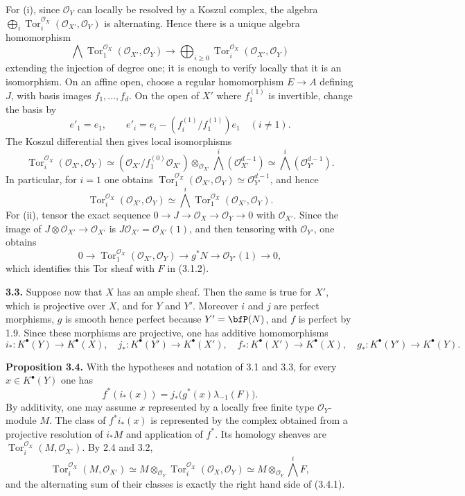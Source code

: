 \documentclass[11pt]{article}
\newcommand{\Tor}{\operatorname{Tor}}
\providecommand{\Tor}{\operatorname{Tor}}
\providecommand{\cO}{\mathcal O}
\begin{document}
For (i), since \(\cO_Y\) can locally be resolved by a Koszul complex, the algebra \(\bigoplus_i\Tor_i^{\cO_X}(\cO_{X'},\cO_Y)\) is alternating. Hence there is a unique algebra homomorphism
\begin{equation}\tag{3.2.1}
\bigwedge \Tor_1^{\cO_X}(\cO_{X'},\cO_Y)
\longrightarrow
\bigoplus_{i\ge0}\Tor_i^{\cO_X}(\cO_{X'},\cO_Y)
\end{equation}
extending the injection of degree one; it is enough to verify locally that it is an isomorphism. On an affine open, choose a regular homomorphism \(E\to A\) defining \(J\), with basis images \(f_1,\ldots,f_d\). On the open of \(X'\) where \(f_1^{(1)}\) is invertible, change the basis by
\[
e'_1=e_1,
\qquad
e'_i=e_i-(f_i^{(1)}/f_1^{(1)})e_1\quad(i\ne1).
\]
The Koszul differential then gives local isomorphisms
\begin{equation}\tag{3.2.2}
\Tor_i^{\cO_X}(\cO_{X'},\cO_Y)
\simeq
(\cO_{X'}/f_1^{(0)}\cO_{X'})\otimes_{\cO_{X'}}
\bigwedge^i(\cO_{X'}^{d-1})
\simeq
\bigwedge^i(\cO_{Y'}^{d-1}).
\end{equation}
In particular, for \(i=1\) one obtains \(\Tor_1^{\cO_X}(\cO_{X'},\cO_Y)\simeq \cO_{Y'}^{d-1}\), and hence
\begin{equation}\tag{3.2.3}
\Tor_i^{\cO_X}(\cO_{X'},\cO_Y)
\simeq
\bigwedge^i\Tor_1^{\cO_X}(\cO_{X'},\cO_Y).
\end{equation}
For (ii), tensor the exact sequence \(0\to J\to\cO_X\to\cO_Y\to0\) with \(\cO_{X'}\). Since the image of \(J\otimes\cO_{X'}\to\cO_{X'}\) is \(J\cO_{X'}=\cO_{X'}(1)\), and then tensoring with \(\cO_{Y'}\), one obtains
\begin{equation}\tag{3.2.4}
0\to \Tor_1^{\cO_X}(\cO_{X'},\cO_Y)\to g^*N\to\cO_{Y'}(1)\to0,
\end{equation}
which identifies this Tor sheaf with \(F\) in (3.1.2).

\textbf{3.3.} Suppose now that \(X\) has an ample sheaf. Then the same is true for \(X'\), which is projective over \(X\), and for \(Y\) and \(Y'\). Moreover \(i\) and \(j\) are perfect morphisms, \(g\) is smooth hence perfect because \(Y'=\bfP(N)\), and \(f\) is perfect by 1.9. Since these morphisms are projective, one has additive homomorphisms
\[
i_*:K^\bullet(Y)\to K^\bullet(X),\quad
j_*:K^\bullet(Y')\to K^\bullet(X'),\quad
f_*:K^\bullet(X')\to K^\bullet(X),\quad
g_*:K^\bullet(Y')\to K^\bullet(Y).
\]

\textbf{Proposition 3.4.} With the hypotheses and notation of 3.1 and 3.3, for every \(x\in K^\bullet(Y)\) one has
\begin{equation}\tag{3.4.1}
f^*(i_*(x))=j_*\bigl(g^*(x)\lambda_{-1}(F)\bigr).
\end{equation}
By additivity, one may assume \(x\) represented by a locally free finite type \(\cO_Y\)-module \(M\). The class of \(f^*i_*(x)\) is represented by the complex obtained from a projective resolution of \(i_*M\) and application of \(f^*\). Its homology sheaves are \(\Tor_i^{\cO_X}(M,\cO_{X'})\). By 2.4 and 3.2,
\[
\Tor_i^{\cO_X}(M,\cO_{X'})
\simeq M\otimes_{\cO_Y}\Tor_i^{\cO_X}(\cO_X,\cO_Y)
\simeq M\otimes_{\cO_Y}\bigwedge^iF,
\]
and the alternating sum of their classes is exactly the right hand side of (3.4.1).
\end{document}
